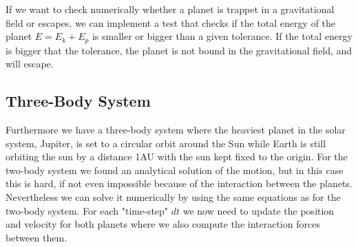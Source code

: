 \documentclass[norsk,a4paper,12pt]{article}
\begin{document}
If we want to check numerically whether a planet is trappet in a gravitational field or escapes, we can implement a test that checks if the total energy of the planet $E = E_k + E_p$ is smaller or bigger than a given tolerance. If the total energy is bigger that the tolerance, the planet is not bound in the gravitational field, and will escape.

\subsection{Three-Body System}
Furthermore we have a three-body system where the heaviest planet in the solar system, Jupiter, is set to a circular orbit around the Sun while Earth is still orbiting the sun by a distance 1AU with the sun kept fixed to the origin. For the two-body system we found an analytical solution of the motion, but in this case this is hard, if not even impossible because of the interaction between the planets. Nevertheless we can solve it numerically by using the same equations as for the two-body system. For each "time-step" $dt$ we now need to update the position and velocity for both planets where we also compute the interaction forces between them. 
\end{document}
